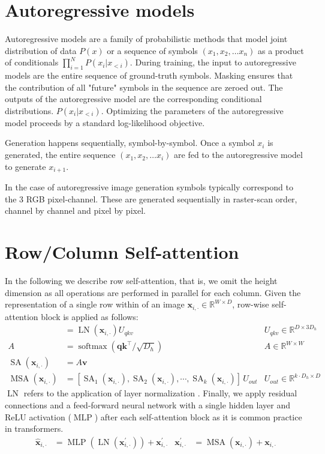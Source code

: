 \documentclass{article} \usepackage{iclr2021_conference,times}
\newcommand{\bb}[1]{\mathbf{#1}}
\newcommand{\bx}{\bb{x}}
\newcommand{\bv}{\bb{v}}
\newcommand{\bk}{\bb{k}}
\newcommand{\bq}{\bb{q}}
\newcommand{\op}[1]{\operatorname{#1}}
\begin{document}
\section{Autoregressive models} \label{sec:autoregressive models}
Autoregressive models are a family of probabilistic methods that model joint distribution of data $P(x)$ or a sequence of symbols $(x_1, x_2, \dots x_n)$ as a product of conditionals $\prod_{i=1}^N P(x_i | x_{<i})$. During training, the input to autoregressive models are the entire sequence of ground-truth symbols. Masking ensures that the contribution of all "future" symbols in the sequence are zeroed out. The outputs of the autoregressive model are the corresponding conditional distributions. $P(x_i | x_{<i})$. Optimizing the parameters of the autoregressive model proceeds by a standard log-likelihood objective.

Generation happens sequentially, symbol-by-symbol. Once a symbol $x_i$ is generated, the entire sequence $(x_1, x_2, \dots x_i)$ are fed to the autoregressive model to generate $x_{i+1}$.

In the case of autoregressive image generation symbols typically correspond to the 3 RGB pixel-channel. These are generated sequentially in raster-scan order, channel by channel and pixel by pixel.


\section{Row/Column Self-attention}\label{sec:row_col_self_attention}

In the following we describe row self-attention, that is, we omit the height dimension as all operations are performed in parallel for each column. Given the representation of a single row within of an image $\bx_{i, \cdot} \in \mathbb{R}^{W {\times} D}$, row-wise self-attention block is applied as follows:
\begin{align}
    [\bq, \bk, \bv] &= \op{LN}(\bx_{i, \cdot}) U_{qkv}
    & U_{qkv} \in \mathbb{R}^{D \times 3 D_h} \label{eq:qkv} \\
    A &= \op{softmax}\left(\bq\bk^\top / \sqrt{D_h}\right)
    & A \in \mathbb{R}^{W \times W} \label{eq:attn_matrix}\\
    \op{SA}(\bx_{i, \cdot}) &= A\bv \label{eq:attn_v} \\
    \op{MSA}(\bx_{i, \cdot}) &= [\op{SA}_1(\bx_{i, \cdot}), \op{SA}_2(\bx_{i, \cdot}), \cdots, \op{SA}_k(\bx_{i, \cdot})] \, U_{out}
    & U_{out} \in \mathbb{R}^{k \cdot D_h \times D}
\end{align}
$\op{LN}$ refers to the application of layer normalization \citep{ba2016layer}. Finally, we apply residual connections and a feed-forward neural network with a single hidden layer and ReLU activation ($\op{MLP}$) after each self-attention block as it is common practice in transformers.
\begin{align}
    \hat{\bx}_{i, \cdot} &= \op{MLP}(\op{LN}(\bx_{i, \cdot}^\prime)) + \bx_{i, \cdot}^\prime &
    \bx_{i, \cdot}^\prime &= \op{MSA}(\bx_{i, \cdot}) + \bx_{i, \cdot} \label{eq:attn}
\end{align}
\end{document}
